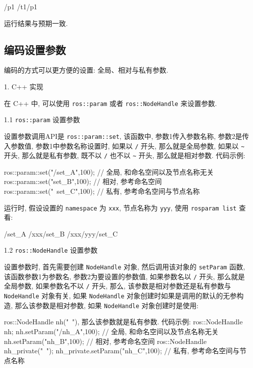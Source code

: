 \documentclass[openany, fontset=windowsold]{ctexbook}
\theoremstyle{kaiti}
\theoremstyle{normal}
\begin{document}
\begin{bash}
  /p1
  /t1/p1
\end{bash}

运行结果与预期一致.

\subsection{编码设置参数}

编码的方式可以更方便的设置: 全局、相对与私有参数.

1. C++ 实现

在 C++ 中, 可以使用 \verb|ros::param| 或者 \verb|ros::NodeHandle| 来设置参数.

1.1 \verb|ros::param| 设置参数

设置参数调用API是 \verb|ros::param::set|, 该函数中, 参数1传入参数名称, 参数2是传入参数值, 参数1中参数名称设置时, 如果以 \verb|/| 开头, 那么就是全局参数, 如果以 \verb|~| 开头, 那么就是私有参数, 既不以 \verb|/| 也不以 \verb|~| 开头, 那么就是相对参数. 代码示例:

\begin{cpp}
  ros::param::set("/set_A",100); // 全局, 和命名空间以及节点名称无关
  ros::param::set("set_B",100); // 相对, 参考命名空间
  ros::param::set("~set_C",100); // 私有, 参考命名空间与节点名称
\end{cpp}

运行时, 假设设置的 \verb|namespace| 为 \verb|xxx|, 节点名称为 \verb|yyy|, 使用 \verb|rosparam list| 查看:

\begin{bash}
  /set_A
  /xxx/set_B
  /xxx/yyy/set_C
\end{bash}

1.2 \verb|ros::NodeHandle| 设置参数

设置参数时, 首先需要创建 \verb|NodeHandle| 对象, 然后调用该对象的 \verb|setParam| 函数, 该函数参数1为参数名, 参数2为要设置的参数值, 如果参数名以 \verb|/| 开头, 那么就是全局参数, 如果参数名不以 \verb|/| 开头, 那么, 该参数是相对参数还是私有参数与 \verb|NodeHandle| 对象有关, 如果 \verb|NodeHandle| 对象创建时如果是调用的默认的无参构造, 那么该参数是相对参数, 如果 \verb|NodeHandle| 对象创建时是使用:

\begin{cpp}
  ros::NodeHandle nh("~"), 那么该参数就是私有参数. 代码示例:
  ros::NodeHandle nh;
  nh.setParam("/nh_A",100); // 全局, 和命名空间以及节点名称无关
  nh.setParam("nh_B",100); // 相对, 参考命名空间
  ros::NodeHandle nh_private("~");
  nh_private.setParam("nh_C",100); // 私有, 参考命名空间与节点名称
\end{cpp}
\end{document}
